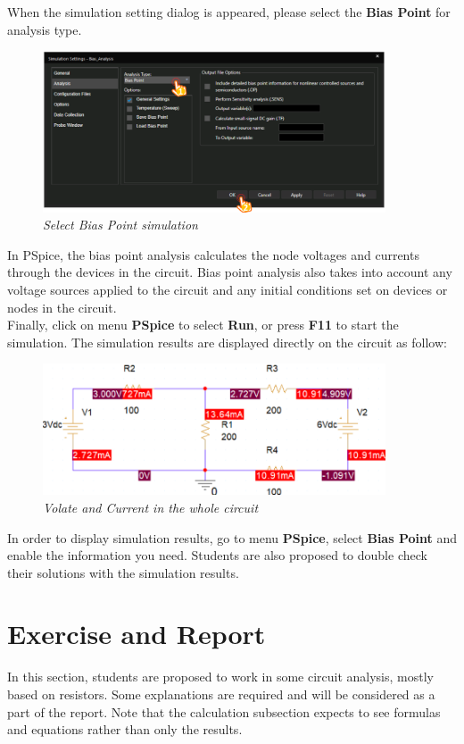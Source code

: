 When the simulation setting dialog is appeared, please select the \textbf{Bias Point} for analysis type.
\begin{figure}[!htp]
    \centering
    \includegraphics[width=4in]{source/picture/bai_1/pic15.PNG}
    \caption{\textit{Select Bias Point simulation}}
    \label{bai1_pic15}
\end{figure}

In PSpice, the bias point analysis calculates the node voltages and currents through the devices in the circuit. Bias point analysis also takes into account any voltage sources applied to the circuit and any initial conditions set on devices or nodes in the circuit. \\

Finally, click on menu \textbf{PSpice} to select \textbf{Run}, or press \textbf{F11} to start the simulation. The simulation results are displayed directly on the circuit as follow:

\begin{figure}[!htp]
    \centering
    \includegraphics[width=4in]{source/picture/bai_1/pic16.PNG}
    \caption{\textit{Volate and Current in the whole circuit}}
    \label{bai1_pic16}
\end{figure}

In order to display simulation results, go to menu \textbf{PSpice}, select \textbf{Bias Point} and enable the information you need. Students are also proposed to double check their solutions with the simulation results.

\def\answer{1}
\section{Exercise and Report}
In this section, students are proposed to work in some circuit analysis, mostly based on resistors. Some explanations are required and will be considered as a part of the report. Note that the calculation subsection expects to see formulas and equations rather than only the results.


